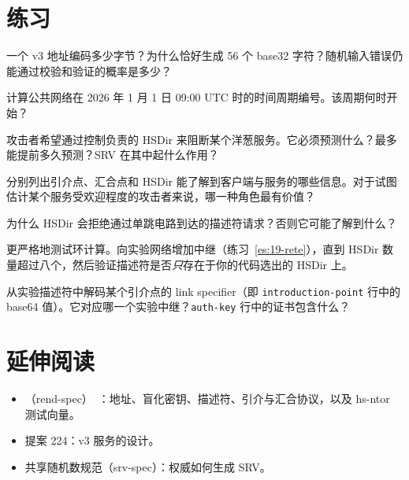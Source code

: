 \section*{练习}

\begin{esercizio}[1]\label{es:14-indirizzo}
一个 v3 地址编码多少字节？为什么恰好生成 56 个 base32 字符？随机输入错误仍能通过校验和验证的概率是多少？
\end{esercizio}

\begin{esercizio}[1]\label{es:14-periodo}
计算公共网络在 2026 年 1 月 1 日 09:00 UTC 时的时间周期编号。该周期何时开始？
\end{esercizio}

\begin{esercizio}[2]\label{es:14-hsdir}
攻击者希望通过控制负责的 HSDir 来阻断某个洋葱服务。它必须预测什么？最多能提前多久预测？SRV 在其中起什么作用？
\end{esercizio}

\begin{esercizio}[2]\label{es:14-ruoli}
分别列出引介点、汇合点和 HSDir 能了解到客户端与服务的哪些信息。对于试图估计某个服务受欢迎程度的攻击者来说，哪一种角色最有价值？
\end{esercizio}

\begin{esercizio}[2]\label{es:14-anonimo}
为什么 HSDir 会拒绝通过单跳电路到达的描述符请求？否则它可能了解到什么？
\end{esercizio}

\begin{esercizio}[3]\label{es:14-anello}
更严格地测试环计算。向实验网络增加中继（练习~\ref{es:19-rete}），直到 HSDir 数量超过八个，然后验证描述符是否\emph{只}存在于你的代码选出的 HSDir 上。
\end{esercizio}

\begin{esercizio}[3]\label{es:14-ipt}
从实验描述符中解码某个引介点的 link specifier（即 \texttt{introduction-point} 行中的 base64 值）。它对应哪一个实验中继？\texttt{auth-key} 行中的证书包含什么？
\end{esercizio}

\section*{延伸阅读}
\begin{itemize}
  \item {}（rend-spec）~\cite{torspec}：地址、盲化密钥、描述符、引介与汇合协议，以及 hs-ntor 测试向量。
  \item 提案 224：v3 服务的设计。
  \item 共享随机数规范（srv-spec）：权威如何生成 SRV。
\end{itemize}
